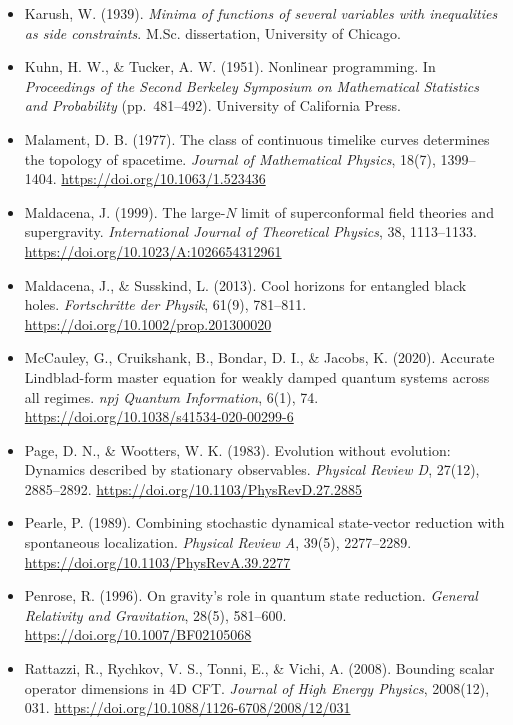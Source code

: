 \documentclass[12pt,a4paper]{article}
\numberwithin{equation}{section}
\begin{document}
\begin{itemize}[leftmargin=0.5in, itemindent=-0.5in, label={}]
\item Karush, W. (1939). \textit{Minima of functions of several variables with inequalities as side constraints}. M.Sc. dissertation, University of Chicago.

\item Kuhn, H. W., \& Tucker, A. W. (1951). Nonlinear programming. In \textit{Proceedings of the Second Berkeley Symposium on Mathematical Statistics and Probability} (pp.\ 481--492). University of California Press.

\item Malament, D. B. (1977). The class of continuous timelike curves determines the topology of spacetime. \textit{Journal of Mathematical Physics}, 18(7), 1399--1404. \url{https://doi.org/10.1063/1.523436}

\item Maldacena, J. (1999). The large-$N$ limit of superconformal field theories and supergravity. \textit{International Journal of Theoretical Physics}, 38, 1113--1133. \url{https://doi.org/10.1023/A:1026654312961}

\item Maldacena, J., \& Susskind, L. (2013). Cool horizons for entangled black holes. \textit{Fortschritte der Physik}, 61(9), 781--811. \url{https://doi.org/10.1002/prop.201300020}

\item McCauley, G., Cruikshank, B., Bondar, D. I., \& Jacobs, K. (2020). Accurate Lindblad-form master equation for weakly damped quantum systems across all regimes. \textit{npj Quantum Information}, 6(1), 74. \url{https://doi.org/10.1038/s41534-020-00299-6}

\item Page, D. N., \& Wootters, W. K. (1983). Evolution without evolution: Dynamics described by stationary observables. \textit{Physical Review D}, 27(12), 2885--2892. \url{https://doi.org/10.1103/PhysRevD.27.2885}

\item Pearle, P. (1989). Combining stochastic dynamical state-vector reduction with spontaneous localization. \textit{Physical Review A}, 39(5), 2277--2289. \url{https://doi.org/10.1103/PhysRevA.39.2277}

\item Penrose, R. (1996). On gravity's role in quantum state reduction. \textit{General Relativity and Gravitation}, 28(5), 581--600. \url{https://doi.org/10.1007/BF02105068}

\item Rattazzi, R., Rychkov, V. S., Tonni, E., \& Vichi, A. (2008). Bounding scalar operator dimensions in 4D CFT. \textit{Journal of High Energy Physics}, 2008(12), 031. \url{https://doi.org/10.1088/1126-6708/2008/12/031}


\end{itemize}
\end{document}
